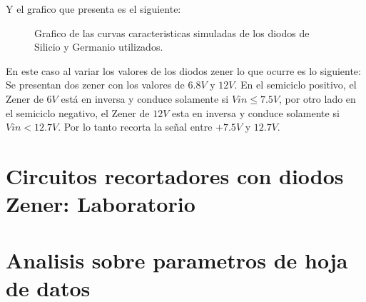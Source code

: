 \documentclass[chaptersright]{informeutn}
\begin{document}
          Y el grafico que presenta es el siguiente:
          \begin{figure}[!ht]
            \centering
            \caption{Grafico de las curvas caracteristicas simuladas de los diodos de Silicio y Germanio utilizados.}
            \label{graph.simulation.recortador.ftf}
          \end{figure}

          En este caso al variar los valores de los diodos zener lo que ocurre es lo siguiente: Se presentan dos
          zener con los valores de $6.8V$ y $12V$. En el semiciclo positivo, el Zener de $6V$ está en inversa y
          conduce solamente si $Vin \leq 7.5V$, por otro lado en el semiciclo negativo, el Zener de $12V$ esta en
          inversa y conduce solamente si $Vin < 12.7V$. Por lo tanto recorta la señal entre $+7.5V$ y $12.7V$.

    \chapter{Circuitos recortadores con diodos Zener: Laboratorio}
    \chapter{Analisis sobre parametros de hoja de datos}
\end{document}
